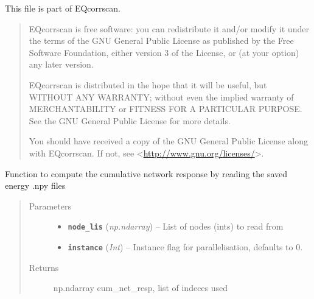 \documentclass[a4paper,10pt,english]{sphinxmanual}
\begin{document}
This file is part of EQcorrscan.
\begin{quote}

EQcorrscan is free software: you can redistribute it and/or modify
it under the terms of the GNU General Public License as published by
the Free Software Foundation, either version 3 of the License, or
(at your option) any later version.

EQcorrscan is distributed in the hope that it will be useful,
but WITHOUT ANY WARRANTY; without even the implied warranty of
MERCHANTABILITY or FITNESS FOR A PARTICULAR PURPOSE.  See the
GNU General Public License for more details.

You should have received a copy of the GNU General Public License
along with EQcorrscan.  If not, see \textless{}\href{http://www.gnu.org/licenses/}{http://www.gnu.org/licenses/}\textgreater{}.
\end{quote}

\begin{fulllineitems}
\label{core:bright_lights._cum_net_resp}
Function to compute the cumulative network response by reading the saved
energy .npy files
\begin{quote}\begin{description}
\item[{Parameters}] \leavevmode\begin{itemize}
\item {} 
\textbf{\texttt{node\_lis}} (\emph{np.ndarray}) -- List of nodes (ints) to read from

\item {} 
\textbf{\texttt{instance}} (\emph{Int}) -- Instance flag for parallelisation, defaults to 0.

\end{itemize}

\item[{Returns}] \leavevmode
np.ndarray cum\_net\_resp, list of indeces used

\end{description}\end{quote}

\end{fulllineitems}

\end{document}
